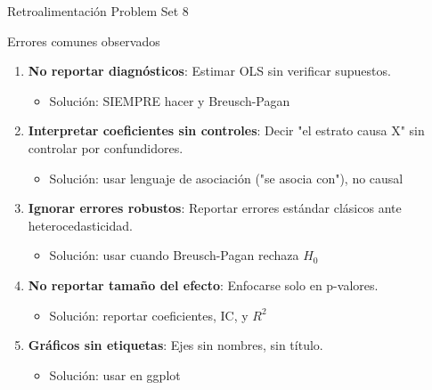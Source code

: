 \documentclass[aspectratio=169, 11pt]{beamer}
\begin{document}
\begin{frame}{Retroalimentación Problem Set 8}
\begin{block}{Errores comunes observados}
\begin{enumerate}
\item \textbf{No reportar diagnósticos}: Estimar OLS sin verificar supuestos.
  \begin{itemize}
  \item Solución: SIEMPRE hacer  y Breusch-Pagan
  \end{itemize}

\item \textbf{Interpretar coeficientes sin controles}: Decir "el estrato causa X" sin controlar por confundidores.
  \begin{itemize}
  \item Solución: usar lenguaje de asociación ("se asocia con"), no causal
  \end{itemize}

\item \textbf{Ignorar errores robustos}: Reportar errores estándar clásicos ante heterocedasticidad.
  \begin{itemize}
  \item Solución: usar  cuando Breusch-Pagan rechaza $H_0$
  \end{itemize}

\item \textbf{No reportar tamaño del efecto}: Enfocarse solo en p-valores.
  \begin{itemize}
  \item Solución: reportar coeficientes, IC, y $R^2$
  \end{itemize}

\item \textbf{Gráficos sin etiquetas}: Ejes sin nombres, sin título.
  \begin{itemize}
  \item Solución: usar  en ggplot
  \end{itemize}
\end{enumerate}
\end{block}
\end{frame}
\end{document}

